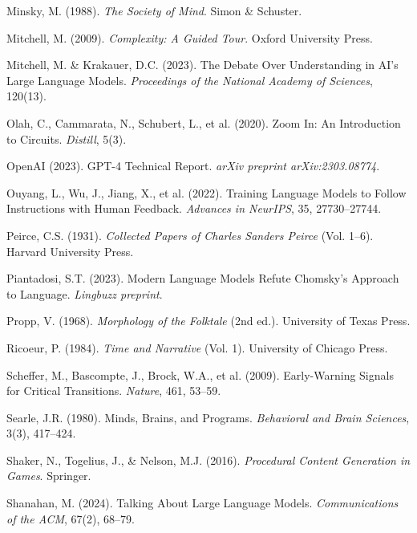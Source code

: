 \documentclass[12pt]{article}
\begin{document}
\begin{thebibliography}{99}
Minsky, M. (1988). \textit{The Society of Mind}. Simon \& Schuster.

Mitchell, M. (2009). \textit{Complexity: A Guided Tour}. Oxford University Press.

Mitchell, M. \& Krakauer, D.C. (2023). The Debate Over Understanding in AI's Large Language Models. \textit{Proceedings of the National Academy of Sciences}, 120(13).

Olah, C., Cammarata, N., Schubert, L., et al. (2020). Zoom In: An Introduction to Circuits. \textit{Distill}, 5(3).

OpenAI (2023). GPT-4 Technical Report. \textit{arXiv preprint arXiv:2303.08774}.

Ouyang, L., Wu, J., Jiang, X., et al. (2022). Training Language Models to Follow Instructions with Human Feedback. \textit{Advances in NeurIPS}, 35, 27730–27744.

Peirce, C.S. (1931). \textit{Collected Papers of Charles Sanders Peirce} (Vol. 1–6). Harvard University Press.

Piantadosi, S.T. (2023). Modern Language Models Refute Chomsky's Approach to Language. \textit{Lingbuzz preprint}.

Propp, V. (1968). \textit{Morphology of the Folktale} (2nd ed.). University of Texas Press.

Ricoeur, P. (1984). \textit{Time and Narrative} (Vol. 1). University of Chicago Press.

Scheffer, M., Bascompte, J., Brock, W.A., et al. (2009). Early-Warning Signals for Critical Transitions. \textit{Nature}, 461, 53–59.

Searle, J.R. (1980). Minds, Brains, and Programs. \textit{Behavioral and Brain Sciences}, 3(3), 417–424.

Shaker, N., Togelius, J., \& Nelson, M.J. (2016). \textit{Procedural Content Generation in Games}. Springer.

Shanahan, M. (2024). Talking About Large Language Models. \textit{Communications of the ACM}, 67(2), 68–79.


\end{thebibliography}
\end{document}
